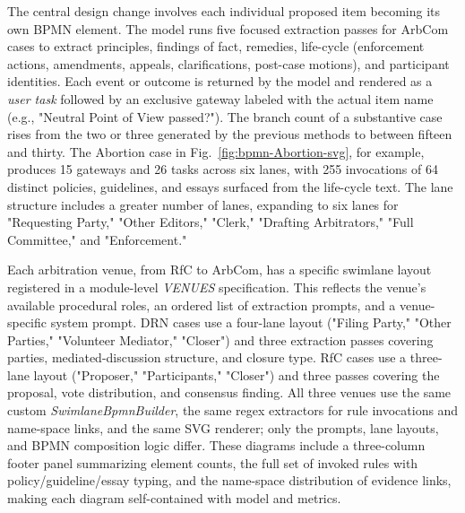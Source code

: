 \documentclass[conference]{IEEEtran}
\begin{document}
The central design change involves each individual proposed item becoming its own BPMN element. The model runs five focused extraction passes for ArbCom cases to extract principles, findings of fact, remedies, life-cycle (enforcement actions, amendments, appeals, clarifications, post-case motions), and participant identities. Each event or outcome is returned by the model and rendered as a \textit{user task} followed by an exclusive gateway labeled with the actual item name (e.g., "Neutral Point of View passed?"). The branch count of a substantive case rises from the two or three generated by the previous methods to between fifteen and thirty. The Abortion case in  Fig.~\ref{fig:bpmn-Abortion-svg}, for example, produces 15 gateways and 26 tasks across six lanes, with 255 invocations of 64 distinct policies, guidelines, and essays surfaced from the life-cycle text. The lane structure includes a greater number of lanes, expanding to six lanes for "Requesting Party," "Other Editors," "Clerk," "Drafting Arbitrators," "Full Committee," and "Enforcement."

Each arbitration venue, from RfC to ArbCom, has a specific swimlane layout registered in a module-level \textit{VENUES} specification. This reflects the venue's available procedural roles, an ordered list of extraction prompts, and a venue-specific system prompt. DRN cases use a four-lane layout ("Filing Party," "Other Parties," "Volunteer Mediator," "Closer") and three extraction passes covering parties, mediated-discussion structure, and closure type. RfC cases use a three-lane layout ("Proposer," "Participants," "Closer") and three passes covering the proposal, vote distribution, and consensus finding. All three venues use the same custom \textit{SwimlaneBpmnBuilder}, the same regex extractors for rule invocations and name-space links, and the same SVG renderer; only the prompts, lane layouts, and BPMN composition logic differ. These diagrams include a three-column footer panel summarizing element counts, the full set of invoked rules with policy/guideline/essay typing, and the name-space distribution of evidence links, making each diagram self-contained with model and metrics.
\end{document}
